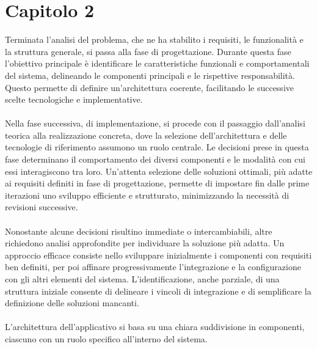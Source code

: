 \chapter{Capitolo 2}

Terminata l'analisi del problema, che ne ha stabilito i requisiti,
le funzionalità e la struttura generale,
si passa alla fase di progettazione.
Durante questa fase l'obiettivo principale è identificare 
le caratteristiche funzionali e comportamentali del sistema,
delineando le componenti principali e le rispettive responsabilità.
Questo permette di definire un'architettura coerente,
facilitando le successive scelte tecnologiche e implementative.\\
\\
Nella fase successiva, di implementazione,
si procede con il passaggio dall'analisi teorica alla realizzazione concreta,
dove la selezione dell'architettura e delle tecnologie di riferimento assumono un ruolo centrale.
Le decisioni prese in questa fase determinano il comportamento dei diversi componenti e
le modalità con cui essi interagiscono tra loro.
Un'attenta selezione delle soluzioni ottimali, 
più adatte ai requisiti definiti in fase di progettazione,
permette di impostare fin dalle prime iterazioni uno sviluppo efficiente e strutturato,
minimizzando la necessità di revisioni successive.\\
\\
Nonostante alcune decisioni risultino immediate o intercambiabili,
altre richiedono analisi approfondite per individuare la soluzione più adatta.
Un approccio efficace consiste nello sviluppare inizialmente i componenti con requisiti ben definiti,
per poi affinare progressivamente l'integrazione e la configurazione con gli altri elementi del sistema.
L'identificazione, anche parziale, di una struttura iniziale 
consente di delineare i vincoli di integrazione e
di semplificare la definizione delle soluzioni mancanti.\\
\\
L'architettura dell'applicativo si basa su una chiara suddivisione in componenti,
ciascuno con un ruolo specifico all'interno del sistema.
\\

